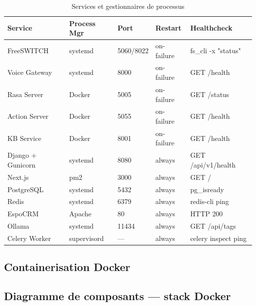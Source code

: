 \begin{table}[H]
  \centering
  \caption{Services et gestionnaires de processus}
  \label{tab:services_processus}
  \begin{tabularx}{\textwidth}{lXllX}
    \toprule
    \textbf{Service} & \textbf{Process Mgr} & \textbf{Port} & \textbf{Restart} & \textbf{Healthcheck} \\
    \midrule
    FreeSWITCH     & systemd   & 5060/8022 & on-failure & fs\_cli -x "status" \\
    Voice Gateway  & systemd   & 8000      & on-failure & GET /health \\
    Rasa Server    & Docker    & 5005      & on-failure & GET /status \\
    Action Server  & Docker    & 5055      & on-failure & GET /health \\
    KB Service     & Docker    & 8001      & on-failure & GET /health \\
    Django + Gunicorn & systemd & 8080    & always     & GET /api/v1/health \\
    Next.js        & pm2       & 3000      & always     & GET / \\
    PostgreSQL     & systemd   & 5432      & always     & pg\_isready \\
    Redis          & systemd   & 6379      & always     & redis-cli ping \\
    EspoCRM        & Apache    & 80        & always     & HTTP 200 \\
    Ollama         & systemd   & 11434     & always     & GET /api/tags \\
    Celery Worker  & supervisord & —      & always     & celery inspect ping \\
    \bottomrule
  \end{tabularx}
\end{table}

\subsection{Containerisation Docker}


\subsection{Diagramme de composants — stack Docker}


